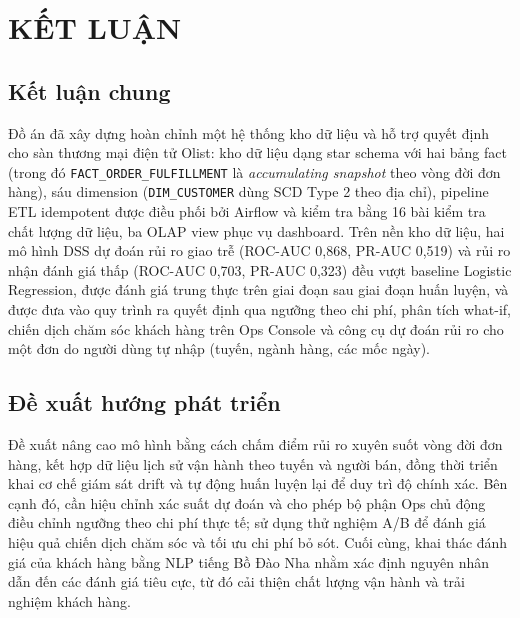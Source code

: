 \section{KẾT LUẬN}

\subsection{Kết luận chung}
\hspace{1cm}
Đồ án đã xây dựng hoàn chỉnh một hệ thống kho dữ liệu và hỗ trợ quyết định cho sàn thương mại
điện tử Olist: kho dữ liệu dạng star schema với hai bảng fact (trong đó
\texttt{FACT\_ORDER\_FULFILLMENT} là \textit{accumulating snapshot} theo vòng đời đơn hàng),
sáu dimension (\texttt{DIM\_CUSTOMER} dùng SCD Type 2 theo địa chỉ), pipeline ETL idempotent
được điều phối bởi Airflow và kiểm tra bằng 16 bài kiểm tra chất lượng dữ liệu, ba OLAP view
phục vụ dashboard. Trên nền kho dữ liệu, hai mô hình DSS dự đoán rủi ro giao trễ (ROC-AUC
0,868, PR-AUC 0,519) và rủi ro nhận đánh giá thấp (ROC-AUC 0,703, PR-AUC 0,323) đều vượt
baseline Logistic Regression, được đánh giá trung thực trên giai đoạn sau giai đoạn huấn luyện,
và được đưa vào quy trình ra quyết định qua ngưỡng theo chi phí, phân tích what-if, chiến
dịch chăm sóc khách hàng trên Ops Console và công cụ dự đoán rủi ro cho một đơn do người dùng tự
nhập (tuyến, ngành hàng, các mốc ngày).




\subsection{Đề xuất hướng phát triển}
Đề xuất nâng cao mô hình bằng cách chấm điểm rủi ro xuyên suốt vòng đời đơn hàng, kết hợp dữ liệu lịch sử vận hành theo tuyến và người bán, đồng thời triển khai cơ chế giám sát drift và tự động huấn luyện lại để duy trì độ chính xác. Bên cạnh đó, cần hiệu chỉnh xác suất dự đoán và cho phép bộ phận Ops chủ động điều chỉnh ngưỡng theo chi phí thực tế; sử dụng thử nghiệm A/B để đánh giá hiệu quả chiến dịch chăm sóc và tối ưu chi phí bỏ sót. Cuối cùng, khai thác đánh giá của khách hàng bằng NLP tiếng Bồ Đào Nha nhằm xác định nguyên nhân dẫn đến các đánh giá tiêu cực, từ đó cải thiện chất lượng vận hành và trải nghiệm khách hàng.
